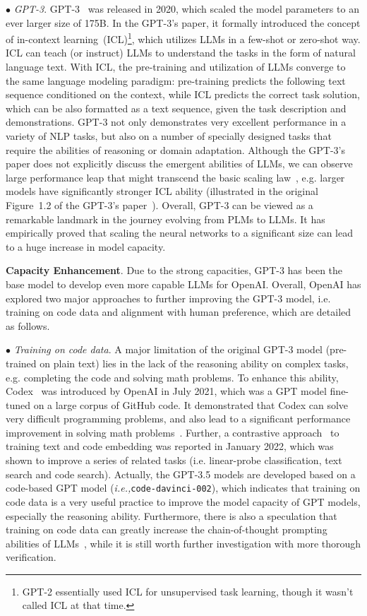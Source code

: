 $\bullet$ \emph{GPT-3}. GPT-3~\cite{Brown-NeurIPS-2020-Language} was released in 2020, which scaled the model parameters to an ever larger size of 175B. In the GPT-3's paper, it formally introduced the concept of in-context learning~(ICL)\footnote{GPT-2 essentially used ICL for unsupervised task learning, though it wasn't called ICL at that time.  }, which utilizes LLMs in a few-shot or zero-shot way. ICL can  teach (or instruct) LLMs to understand the tasks  in the form of natural language text. With ICL, the pre-training and utilization of LLMs converge to the same language modeling paradigm: pre-training predicts the following text sequence conditioned on the context, while ICL predicts the correct task solution, which can be  also formatted as a text sequence, given the task description and demonstrations. GPT-3 not only demonstrates very excellent performance in a variety of NLP tasks, but also on a number of specially designed tasks that require the abilities of reasoning or domain adaptation. Although the GPT-3's paper does not explicitly discuss the emergent abilities of LLMs, we can observe  large performance leap that might transcend the basic scaling law~\cite{Kaplan-arxiv-2020-Scaling}, e.g. larger models have significantly stronger ICL ability (illustrated in the original Figure~1.2 of the GPT-3's  paper~\cite{Brown-NeurIPS-2020-Language}).  Overall, GPT-3 can be viewed as a remarkable landmark in the journey evolving  from PLMs to LLMs.  It has empirically proved that scaling the neural networks to a  significant size can lead to a huge increase in model capacity. 

\textbf{Capacity Enhancement}. Due to the strong capacities,  GPT-3  has been the base model to develop even more capable LLMs for OpenAI. Overall, OpenAI has explored  two major approaches to further improving the GPT-3 model, i.e. training on code data and alignment with human preference, which are detailed as follows. 

$\bullet$ \emph{Training on code data}. A major limitation of the original  GPT-3 model  (pre-trained on plain text) lies in the lack of the reasoning ability on complex tasks, e.g. completing the code and solving math problems. To enhance this ability,  Codex~\cite{Chen-arxiv-2021-evaluating} was introduced by OpenAI in July 2021, which was a GPT model fine-tuned on a large corpus of GitHub code. It demonstrated that Codex can solve very difficult programming problems, and also lead to a significant performance  improvement in solving math problems~\cite{Drori-CoRR-2021-A}. Further, a contrastive approach~\cite{Neelakantan-CoRR-2022-Text} to training text and code embedding was reported in January 2022, which was shown to improve a series of related tasks (i.e. linear-probe classification, text search and code search). Actually, the GPT-3.5 models are developed based on a code-based GPT model (\emph{i.e.,}\texttt{code-davinci-002}), which indicates that training on code data is a very useful practice to improve the model capacity  of GPT models, especially the reasoning ability. Furthermore, there is  also a speculation  that training on code data can greatly increase the chain-of-thought prompting abilities of LLMs~\cite{FU-blog-2022-how}, while it is still worth further investigation with more thorough verification. 

